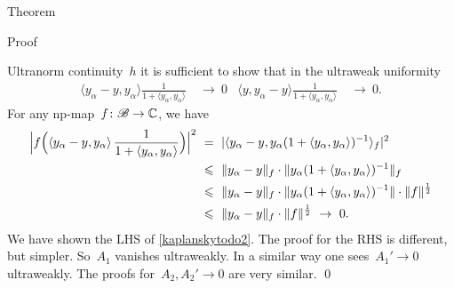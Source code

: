 \documentclass[b]{subfiles}
\begin{document}
\begin{parsec}
\begin{point}{Theorem}
\begin{point}{Proof}
\begin{point}{Ultranorm continuity~$h$}
    it is sufficient to show that in the ultraweak uniformity
\begin{align}\label{kaplanskytodo2}
    \langle y_\alpha - y, y_\alpha \rangle \frac{1}{1 + \langle y_\alpha, y_\alpha\rangle} & \ \to\  0 &
    \langle y, y_\alpha  -y\rangle \frac{1}{1 + \langle y_\alpha, y_\alpha\rangle} & \ \to \ 0.
\end{align}
For any np-map~$f\colon \mathscr{B} \to \mathbb{C}$, we have
\begin{align*}
   \Bigl| f\Bigl(\left\langle y_\alpha - y, y_\alpha \right\rangle \frac{1}{1+\langle y_\alpha, y_\alpha\rangle}\Bigr)\Bigr|^2
    & \ = \ 
    |\langle y_\alpha - y, y_\alpha (1 + \langle y_\alpha, y_\alpha  \rangle)^{-1}
    \rangle_f|^2 \\
    & \ \leq \ 
    \| y_\alpha - y \|_f \cdot \| y_\alpha (1 + \langle y_\alpha, y_\alpha  \rangle)^{-1} \|_f \\
    & \ \leq \  \|
    y_\alpha - y \|_f \cdot \| y_\alpha (1 + \langle y_\alpha, y_\alpha  \rangle)^{-1} \| \cdot
    \|f\|^{\frac{1}{2}}
    \\
    & \ \leq \ 
    \| y_\alpha - y \|_f \cdot \|f\|^{\frac{1}{2}} \ \rightarrow \ 0.
\end{align*}
We have shown the LHS of \eqref{kaplanskytodo2}.
The proof for the RHS is different, but simpler.
So~$A_1$ vanishes ultraweakly.
In a similar way one sees~$A_1' \to 0$ ultraweakly.
The proofs for~$A_2, A_2' \to 0$ are very similar. \qed
\end{point}
\end{point}
\end{point}
\end{parsec}
\end{document}
